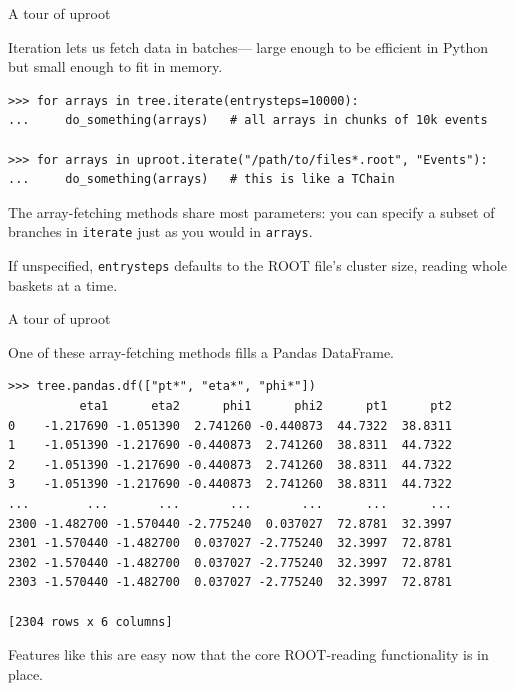 \documentclass[aspectratio=169]{beamer}
\begin{document}
\begin{frame}[fragile]{A tour of uproot}
\vspace{0.5 cm}
\small

{\normalsize Iteration lets us fetch data in batches--- large enough to be efficient in Python but small enough to fit in memory.}

\begin{verbatim}
>>> for arrays in tree.iterate(entrysteps=10000):
...     do_something(arrays)   # all arrays in chunks of 10k events

>>> for arrays in uproot.iterate("/path/to/files*.root", "Events"):
...     do_something(arrays)   # this is like a TChain
\end{verbatim}

\vspace{0.2 cm}
{\normalsize The array-fetching methods share most parameters: you can specify a subset of branches in {\tt\small iterate} just as you would in {\tt\small arrays}.}

\vspace{0.2 cm}
{\normalsize If unspecified, {\tt\small entrysteps} defaults to the ROOT file's cluster size, reading whole baskets at a time.}
\end{frame}

\begin{frame}[fragile]{A tour of uproot}
\vspace{0.5 cm}
\small

{\normalsize One of these array-fetching methods fills a Pandas DataFrame.}

\begin{verbatim}
>>> tree.pandas.df(["pt*", "eta*", "phi*"])
          eta1      eta2      phi1      phi2      pt1      pt2
0    -1.217690 -1.051390  2.741260 -0.440873  44.7322  38.8311
1    -1.051390 -1.217690 -0.440873  2.741260  38.8311  44.7322
2    -1.051390 -1.217690 -0.440873  2.741260  38.8311  44.7322
3    -1.051390 -1.217690 -0.440873  2.741260  38.8311  44.7322
...        ...       ...       ...       ...      ...      ...
2300 -1.482700 -1.570440 -2.775240  0.037027  72.8781  32.3997
2301 -1.570440 -1.482700  0.037027 -2.775240  32.3997  72.8781
2302 -1.570440 -1.482700  0.037027 -2.775240  32.3997  72.8781
2303 -1.570440 -1.482700  0.037027 -2.775240  32.3997  72.8781

[2304 rows x 6 columns]
\end{verbatim}

\vspace{0.2 cm}
{\normalsize Features like this are easy now that the core ROOT-reading functionality is in place.}
\end{frame}
\end{document}

